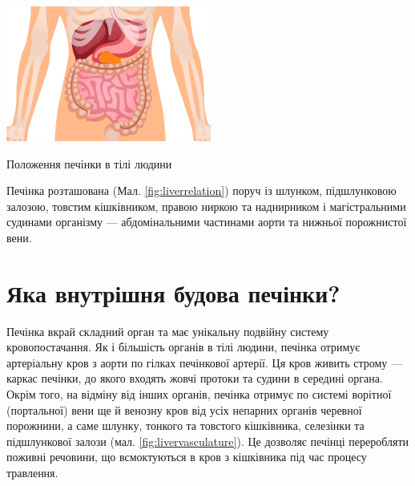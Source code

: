 \begin{marginfigure}[10pt]%
  \includegraphics[width=\linewidth]{Figures/LiverRelation.png}
  \caption{Положення печінки в тілі людини}
  \label{fig:liverrelation}
\end{marginfigure}

Печінка розташована (Мал. \ref{fig:liverrelation}) поруч із шлунком, підшлунковою залозою, товстим кішківником, правою ниркою та наднирником і магістральними судинами організму — абдомінальними частинами аорти та нижньої порожнистої вени. 

\section{Яка внутрішня будова печінки?}

Печінка вкрай складний орган та має унікальну подвійну систему кровопостачання. Як і більшість органів в тілі людини, печінка отримує артеріальну кров з аорти по гілках печінкової артерії. Ця кров живить строму — каркас печінки, до якого входять жовчі протоки та судини в середині органа. Окрім того, на відміну від інших органів, печінка отримує по системі ворітної (портальної) вени ще й венозну кров від усіх непарних органів черевної порожнини, а саме шлунку, тонкого та товстого кішківника, селезінки та підшлункової залози (мал. \ref{fig:livervasculature}). Це дозволяє печінці переробляти поживні речовини, що всмоктуються в кров з кішківника під час процесу травлення.  

